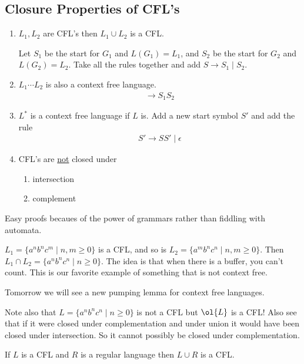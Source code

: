 \documentclass[../598comp.tex]{subfiles}
\begin{document}
\subsection{Closure Properties of CFL's}
\begin{enumerate}
\item 
  $L_1, L_2$ are CFL's then $L_1 \cup L_2$ is a CFL.
  
  Let $S_1$ be the start for $G_1$ and $L(G_1) = L_1$, and $S_2$ be the start
  for $G_2$ and $L(G_2) = L_2$. Take all the rules together and add $S \to S_1
  \mid S_2$.
\item
  $L_1 \cdots L_2$ is also a context free language.
  \begin{gather*}
     \to S_1 S_2
  \end{gather*}
\item
  $L^*$ is a context free language if $L$ is. Add a new start symbol $S'$ and
  add the rule
  \begin{gather*}
    S' \to SS' \mid \epsilon
  \end{gather*}
\item
  CFL's are \ul{not} closed under
  \begin{enumerate}
  \item 
    intersection
  \item
    complement
  \end{enumerate}
\end{enumerate}
Easy proofs becaues of the power of grammars rather than fiddling with automata.

\begin{example}
  $L_1 = \{a^nb^nc^m \mid n, m \geq 0\}$ is a CFL, and so is $L_2 = \{a^mb^nc^n \mid n, m
  \geq 0\}$. Then $L_1 \cap L_2 = \{a^nb^nc^n \mid n \geq 0\}$. The idea is that
  when there is a buffer, you can't count. This is our favorite example of
  something that is not context free.
  
  Tomorrow we will see a new pumping lemma for context free languages.
  
  Note also that $L = \{a^nb^nc^n \mid n \geq 0\}$ is not a CFL but $\ol{L}$ is
  a CFL! Also see that if it were closed under complementation and under union
  it would have been closed under intersection. So it cannot possibly be closed
  under complementation.
\end{example}

\begin{proposition}
  If $L$ is a CFL and $R$ is a regular language then $L \cup R$ is a CFL.
\end{proposition}
\end{document}
